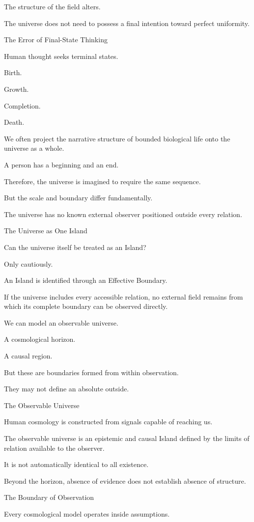 The structure of the field alters.

The universe does not need to possess a final intention toward perfect uniformity.

The Error of Final-State Thinking

Human thought seeks terminal states.

Birth.

Growth.

Completion.

Death.

We often project the narrative structure of bounded biological life onto the universe as a whole.

A person has a beginning and an end.

Therefore, the universe is imagined to require the same sequence.

But the scale and boundary differ fundamentally.

The universe has no known external observer positioned outside every relation.

The Universe as One Island

Can the universe itself be treated as an Island?

Only cautiously.

An Island is identified through an Effective Boundary.

If the universe includes every accessible relation, no external field remains from which its complete boundary can be observed directly.

We can model an observable universe.

A cosmological horizon.

A causal region.

But these are boundaries formed from within observation.

They may not define an absolute outside.

The Observable Universe

Human cosmology is constructed from signals capable of reaching us.

The observable universe is an epistemic and causal Island defined by the limits of relation available to the observer.

It is not automatically identical to all existence.

Beyond the horizon, absence of evidence does not establish absence of structure.

The Boundary of Observation

Every cosmological model operates inside assumptions.

